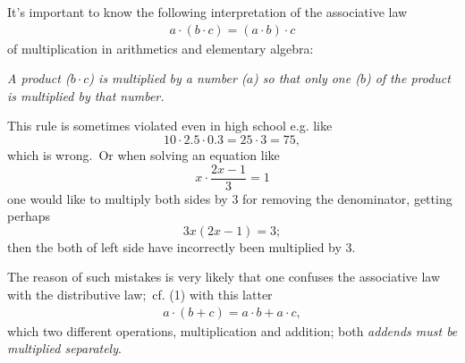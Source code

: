 \documentclass[12pt]{article}
\begin{document}
It's important to know the following interpretation of the associative law
\begin{align}
a\cdot(b\cdot c) = (a\cdot b)\cdot c
\end{align}
of multiplication in arithmetics and elementary algebra:
 
{\em A product ($b\cdot c$) is multiplied by a number ($a$) so that only one  ($b$) of the product is multiplied by that number.}

This rule is sometimes violated even in high school  e.g. like
$$10 \cdot 2.5 \cdot 0.3 = 25 \cdot 3 = 75,$$
which is wrong. \,Or when solving an equation like
$$x\cdot\frac{2x-1}{3} = 1$$
one would like to multiply both sides by 3 for removing the denominator, getting perhaps
$$3x(2x-1) = 3;$$
then the both  of left side have incorrectly been multiplied by 3.

The reason of such mistakes is very likely that one confuses the associative law with the distributive law; \,cf. (1) with this latter
\begin{align}
a\cdot(b+c) = a\cdot b+a\cdot c,
\end{align}
which  two different operations, multiplication and addition;  both {\em addends must be multiplied separately}.
\end{document}
